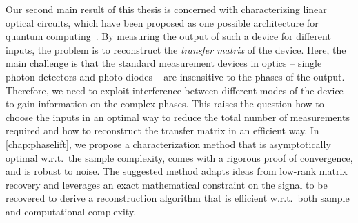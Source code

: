 Our second main result of this thesis is concerned with characterizing linear optical circuits, which have been proposed as one possible architecture for quantum computing~\cite{}.
By measuring the output of such a device for different inputs, the problem is to reconstruct the \emph{transfer matrix} of the device.
Here, the main challenge is that the standard measurement devices in optics -- single photon detectors and photo diodes -- are insensitive to the phases of the output.
Therefore, we need to exploit interference between different modes of the device to gain information on the complex phases.
This raises the question how to choose the inputs in an optimal way to reduce the total number of measurements required and how to reconstruct the transfer matrix in an efficient way.
In \cref{chap:phaselift}, we propose a characterization method that is asymptotically optimal w.r.t.\ the sample complexity, comes with a rigorous proof of convergence, and is robust to noise.
The suggested method adapts ideas from low-rank matrix recovery and leverages an exact mathematical constraint on the signal to be recovered to derive a reconstruction algorithm that is efficient w.r.t.\ both sample and computational complexity.


